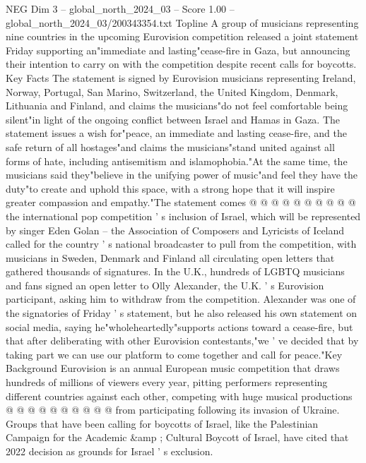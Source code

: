 \begin{textsample}{NEG Dim 3 – global\_north\_2024\_03 – Score 1.00 – global\_north\_2024\_03/200343354.txt}  \label{ex:f3_neg_165}
Topline A group of musicians representing nine countries in the upcoming Eurovision competition released a joint statement Friday supporting an"immediate and lasting"cease-fire in Gaza, but announcing their intention to carry on with the competition despite recent calls for boycotts.
Key Facts The statement is signed by Eurovision musicians representing Ireland, Norway, Portugal, San Marino, Switzerland, the United Kingdom, Denmark, Lithuania and Finland, and claims the musicians"do not feel comfortable being silent"in light of the ongoing conflict between Israel and Hamas in Gaza.
The statement issues a wish for"peace, an immediate and lasting cease-fire, and the safe return of all hostages"and claims the musicians"stand united against all forms of hate, including antisemitism and islamophobia."At the same time, the musicians said they"believe in the unifying power of music"and feel they have the duty"to create and uphold this space, with a strong hope that it will inspire greater compassion and empathy."The statement comes @ @ @ @ @ @ @ @ @ @ the international pop competition ' s inclusion of Israel, which will be represented by singer Eden Golan -- the Association of Composers and Lyricists of Iceland called for the country ' s national broadcaster to pull from the competition, with musicians in Sweden, Denmark and Finland all circulating open letters that gathered thousands of signatures.
In the U.K., hundreds of LGBTQ musicians and fans signed an open letter to Olly Alexander, the U.K. ' s Eurovision participant, asking him to withdraw from the competition.
Alexander was one of the signatories of Friday ' s statement, but he also released his own statement on social media, saying he"wholeheartedly"supports actions toward a cease-fire, but that after deliberating with other Eurovision contestants,"we ' ve decided that by taking part we can use our platform to come together and call for peace."Key Background Eurovision is an annual European music competition that draws hundreds of millions of viewers every year, pitting performers representing different countries against each other, competing with huge musical productions @ @ @ @ @ @ @ @ @ @ from participating following its invasion of Ukraine.
Groups that have been calling for boycotts of Israel, like the Palestinian Campaign for the Academic \&amp ; Cultural Boycott of Israel, have cited that 2022 decision as grounds for Israel ' s exclusion.

\end{textsample}

